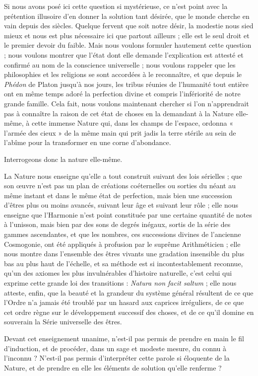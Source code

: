 \documentclass[a4paper, 11pt, oneside, landscape]{article}
\begin{document}
Si nous avons posé ici cette question si mystérieuse, ce n'est point avec la prétention illusoire d'en donner la solution tant désirée, que le monde cherche en vain depuis des siècles. Quelque fervent que soit notre désir, la modestie nous sied mieux et nous est plus nécessaire ici que partout ailleurs ; elle est le seul droit et le premier devoir du faible. Mais nous voulons formuler hautement cette question ; nous voulons montrer que l'état dont elle demande l'explication est attesté et confirmé au nom de la conscience universelle ; nous voulons rappeler que les philosophies et les religions se sont accordées à le reconnaître, et que depuis le \emph{Phédon} de Platon jusqu'à nos jours, les tribus réunies de l'humanité tout entière ont en même temps adoré la perfection divine et compris l'infériorité de notre grande famille. Cela fait, nous voulons maintenant chercher si l'on n'apprendrait pas à connaître la raison de cet état de choses en la demandant à la Nature elle-même, à cette immense Nature qui, dans les champs de l'espace, ordonna « l'armée des cieux » de la même main qui prit jadis la terre stérile au sein de l'abîme pour la transformer en une corne d'abondance.

Interrogeons donc la nature elle-même.

La Nature nous enseigne qu'elle a tout construit suivant des lois sérielles ; que son œuvre n'est pas un plan de créations coéternelles ou sorties du néant au même instant et dans le même état de perfection, mais bien une succession d'êtres plus ou moins avancés, suivant leur âge et suivant leur rôle ; elle nous enseigne que l'Harmonie n'est point constituée par une certaine quantité de notes à l'unisson, mais bien par des sons de degrés inégaux, sortis de la série des gammes ascendantes, et que les nombres, ces successions divines de l'ancienne Cosmogonie, ont été appliqués à profusion par le suprême Arithméticien ; elle nous montre dans l'ensemble des êtres vivants une gradation insensible du plus bas au plus haut de l'échelle, et sa méthode est si incontestablement reconnue, qu'un des axiomes les plus invulnérables d'histoire naturelle, c'est celui qui exprime cette grande loi des transitions : \emph{Natura non facit saltum} ; elle nous atteste, enfin, que la beauté et la grandeur du système général résultent de ce que l'Ordre n'a jamais été troublé par un hasard aux caprices irréguliers, de ce que cet ordre règne sur le développement successif des choses, et de ce qu'il domine en souverain la Série universelle des êtres.

Devant cet enseignement unanime, n'est-il pas permis de prendre en main le fil d'induction, et de procéder, dans un sage et modeste mesure, du connu à l'inconnu ? N'est-il pas permis d'interpréter cette parole si éloquente de la Nature, et de prendre en elle les éléments de solution qu'elle renferme ?
\end{document}
